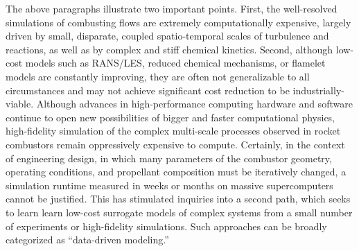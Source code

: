 The above paragraphs illustrate two important points. First, the well-resolved simulations of combusting flows are extremely computationally expensive, largely driven by small, disparate, coupled spatio-temporal scales of turbulence and reactions, as well as by complex and stiff chemical kinetics. Second, although low-cost models such as RANS/LES, reduced chemical mechanisms, or flamelet models are constantly improving, they are often not generalizable to all circumstances and may not achieve significant cost reduction to be industrially-viable. Although advances in high-performance computing hardware and software continue to open new possibilities of bigger and faster computational physics, high-fidelity simulation of the complex multi-scale processes observed in rocket combustors remain oppressively expensive to compute. Certainly, in the context of engineering design, in which many parameters of the combustor geometry, operating conditions, and propellant composition must be iteratively changed, a simulation runtime measured in weeks or months on massive supercomputers cannot be justified. This has stimulated inquiries into a second path, which seeks to learn learn low-cost surrogate models of complex systems from a small number of experiments or high-fidelity simulations. Such approaches can be broadly categorized as ``data-driven modeling.''